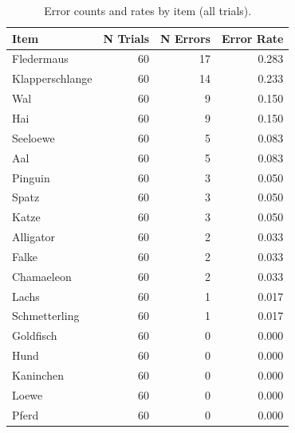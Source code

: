 \begin{table}[htbp]
\centering
\caption{Error counts and rates by item (all trials).}
\label{tab:error-by-item}
\begin{tabular}{lrrr}
\toprule
Item & N Trials & N Errors & Error Rate \\
\midrule
Fledermaus & 60 & 17 & 0.283 \\
Klapperschlange & 60 & 14 & 0.233 \\
Wal & 60 & 9 & 0.150 \\
Hai & 60 & 9 & 0.150 \\
Seeloewe & 60 & 5 & 0.083 \\
Aal & 60 & 5 & 0.083 \\
Pinguin & 60 & 3 & 0.050 \\
Spatz & 60 & 3 & 0.050 \\
Katze & 60 & 3 & 0.050 \\
Alligator & 60 & 2 & 0.033 \\
Falke & 60 & 2 & 0.033 \\
Chamaeleon & 60 & 2 & 0.033 \\
Lachs & 60 & 1 & 0.017 \\
Schmetterling & 60 & 1 & 0.017 \\
Goldfisch & 60 & 0 & 0.000 \\
Hund & 60 & 0 & 0.000 \\
Kaninchen & 60 & 0 & 0.000 \\
Loewe & 60 & 0 & 0.000 \\
Pferd & 60 & 0 & 0.000 \\
\bottomrule
\end{tabular}
\end{table}